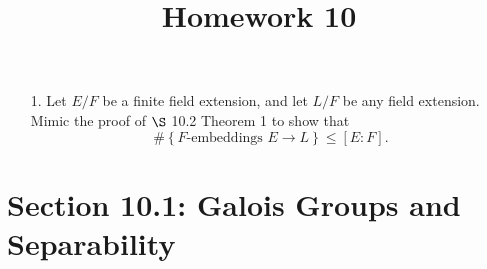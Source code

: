 \documentclass{article}
\begin{document}
\title{Homework 10}
\maketitle
\thispagestyle{fancy}

\begin{itemize}
	\item[1.] Let $E/F$ be a finite field extension, and let $L/F$ be any field extension. Mimic the proof of $\S$ 10.2 Theorem 1 to show that
		\[\#\left\{ F\text{-embeddings } E\to L \right\}\le [E:F].\]
		
\end{itemize}

\section*{Section 10.1: Galois Groups and Separability}
\end{document}
